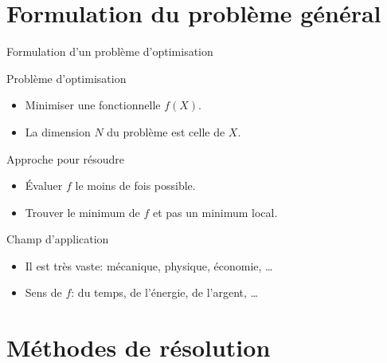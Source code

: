\documentclass[8pt,a4paper]{beamer}
\begin{document}
\section{Formulation du problème général}

\begin{frame}{Formulation d'un problème d'optimisation}
    
  \begin{block}{Problème d'optimisation}
  \begin{itemize}
  \item Minimiser une fonctionnelle $f(X)$.
  \item La dimension $N$ du problème est celle de $X$. 
  \end{itemize}
  \end{block}
  
 \begin{block}{Approche pour résoudre}
  \begin{itemize}
  \item Évaluer $f$ le moins de fois possible.
  \item Trouver le minimum de $f$ et pas un minimum local.
  \end{itemize}
  \end{block} 
  
 \begin{block}{Champ d'application}
  \begin{itemize}
  \item Il est très vaste: mécanique, physique, économie, \ldots
  \item Sens de $f$: du temps, de l'énergie, de l'argent, \ldots
  \end{itemize}
  \end{block}   
  
\end{frame}

\section{Méthodes de résolution}
\end{document}
